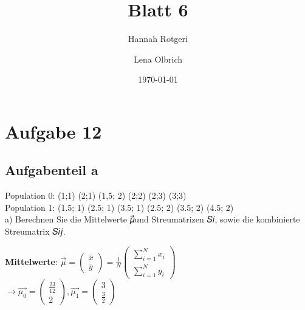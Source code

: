 \documentclass[11pt,a4paper]{article}
\title{Blatt 6}
\date{\today}
\author{Hannah Rotgeri \and Lena Olbrich}
\begin{document}
    \maketitle

    \section*{Aufgabe 12}
\subsection*{Aufgabenteil a}
Population 0: (1;1) (2;1) (1,5; 2) (2;2) (2;3) (3;3) \\
Population 1: (1.5; 1) (2.5; 1) (3.5; 1) (2.5; 2) (3.5; 2) (4.5; 2)
\\
\noindent a)  Berechnen Sie die Mittelwerte 𝜇⃗und Streumatrizen 𝑆𝑖, sowie die kombinierte Streumatrix 𝑆𝑖𝑗.

\noindent \textbf{Mittelwerte}:
$\vec{\mu}=
\begin{pmatrix}
\bar{x} \\
\bar{y}
\end{pmatrix}=
\frac{1}{N}\begin{pmatrix}
\sum_{i=1}^{N} x_{i} \\
\sum_{i=1}^{N} y_{i}
\end{pmatrix}
$ \\
$
\rightarrow \vec{\mu_0}=
\begin{pmatrix}
\frac{23}{12} \\
2
\end{pmatrix},
\vec{\mu_1}=
\begin{pmatrix}
3 \\
\frac{3}{2}
\end{pmatrix}
$
\end{document}
